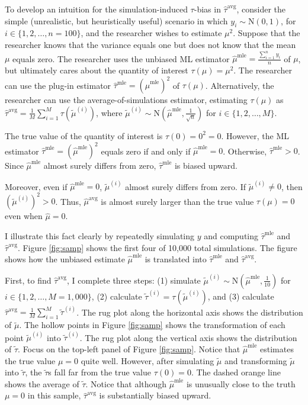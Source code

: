 \documentclass[12pt]{article}
\begin{document}
To develop an intuition for the simulation-induced $\tau$-bias in $\hat{\tau}^\text{avg}$, consider the simple (unrealistic, but heuristically useful) scenario in which $y_i \sim \text{N}(0, 1)$, for $i \in \{1, 2, \ldots, n = 100\}$, and the researcher wishes to estimate $\mu^2$. Suppose that the researcher knows that the variance equals one but does not know that the mean $\mu$ equals zero. The researcher uses the unbiased ML estimator $\hat{\mu}^\text{mle} = \frac{\sum_{i=1}^n y_i}{n}$ of $\mu$, but ultimately cares about the quantity of interest $\tau(\mu) = \mu^2$. The researcher can use the plug-in estimator $\hat{\tau}^\text{mle} = \left( \hat{\mu}^\text{mle} \right) ^2$ of $\tau(\mu)$. Alternatively, the researcher can use the average-of-simulations estimator, estimating $\tau(\mu)$ as $\hat{\tau}^\text{avg} = \frac{1}{M} \sum_{i = 1}^M \tau \left( \tilde{\mu}^{(i)} \right)$, where $\tilde{\mu}^{(i)} \sim \text{N} \left( \hat{\mu}^\text{mle}, \frac{1}{\sqrt{n}} \right)$ for $i \in \{1, 2,\ldots, M\}$.

The true value of the quantity of interest is $\tau(0) = 0^2 = 0$. However, the ML estimator $\hat{\tau}^\text{mle} = \left( \hat{\mu}^\text{mle} \right)^2$ equals zero if and only if $\hat{\mu}^\text{mle} = 0$. Otherwise, $\hat{\tau}^\text{mle} > 0$. Since $\hat{\mu}^\text{mle}$ almost surely differs from zero,  $\hat{\tau}^\text{mle}$ is biased upward.

Moreover, even if $\hat{\mu}^\text{mle} = 0$, $\tilde{\mu}^{(i)}$ almost surely differs from zero. If $\tilde{\mu}^{(i)} \neq 0$, then $\left( \tilde{\mu}^{(i)} \right)^2 > 0$. Thus, $\hat{\mu}^\text{avg}$ is almost surely larger than the true value $\tau(\mu) = 0$ even when $\hat{\mu} = 0$.

I illustrate this fact clearly by repeatedly simulating $y$ and computing $\hat{\tau}^\text{mle}$ and $\hat{\tau}^\text{avg}$. Figure \ref{fig:samp} shows the first four of 10,000 total simulations. The figure shows how the unbiased estimate $\hat{\mu}^\text{mle}$ is translated into $\hat{\tau}^\text{mle}$ and $\hat{\tau}^\text{avg}$.

First, to find $\hat{\tau}^\text{avg}$, I complete three steps: (1) simulate $\tilde{\mu}^{(i)} \sim \text{N} \left( \hat{\mu}^\text{mle}, \frac{1}{10{}} \right)$ for $i \in \{1, 2,\ldots, M = 1,000\}$, (2) calculate $\tilde{\tau}^{(i)} = \tau\left( \tilde{\mu}^{(i)} \right)$, and (3) calculate $\hat{\tau}^\text{avg} = \frac{1}{M} \sum_{i = 1}^M \tilde{\tau}^{(i)}$. The rug plot along the horizontal axis shows the distribution of $\tilde{\mu}$. The hollow points in Figure \ref{fig:samp} shows the transformation of each point $\tilde{\mu}^{(i)}$ into $\tilde{\tau}^{(i)}$. The rug plot along the vertical axis shows the distribution of $\tilde{\tau}$.
Focus on the top-left panel of Figure \ref{fig:samp}. Notice that $\hat{\mu}^\text{mle}$ estimates the true value $\mu = 0$ quite well. However, after simulating $\tilde{\mu}$ and transforming $\tilde{\mu}$ into $\tilde{\tau}$, the $\tilde{\tau}$s fall far from the true value $\tau(0) = 0$. The dashed orange line shows the average of $\tilde{\tau}$. Notice that although $\hat{\mu}^\text{mle}$ is unusually close to the truth $\mu = 0$ in this sample, $\hat{\tau}^\text{avg}$ is substantially biased upward.
\end{document}
